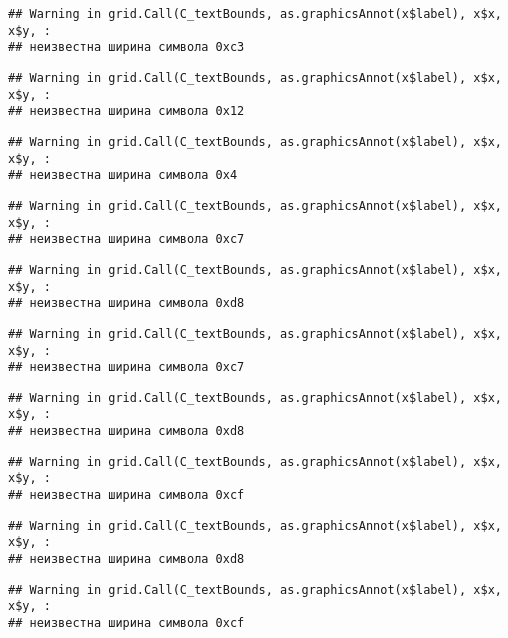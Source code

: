 \documentclass[
]{article}
\begin{document}
\begin{verbatim}
## Warning in grid.Call(C_textBounds, as.graphicsAnnot(x$label), x$x, x$y, :
## неизвестна ширина символа 0xc3
\end{verbatim}

\begin{verbatim}
## Warning in grid.Call(C_textBounds, as.graphicsAnnot(x$label), x$x, x$y, :
## неизвестна ширина символа 0x12
\end{verbatim}

\begin{verbatim}
## Warning in grid.Call(C_textBounds, as.graphicsAnnot(x$label), x$x, x$y, :
## неизвестна ширина символа 0x4
\end{verbatim}

\begin{verbatim}
## Warning in grid.Call(C_textBounds, as.graphicsAnnot(x$label), x$x, x$y, :
## неизвестна ширина символа 0xc7
\end{verbatim}

\begin{verbatim}
## Warning in grid.Call(C_textBounds, as.graphicsAnnot(x$label), x$x, x$y, :
## неизвестна ширина символа 0xd8
\end{verbatim}

\begin{verbatim}
## Warning in grid.Call(C_textBounds, as.graphicsAnnot(x$label), x$x, x$y, :
## неизвестна ширина символа 0xc7
\end{verbatim}

\begin{verbatim}
## Warning in grid.Call(C_textBounds, as.graphicsAnnot(x$label), x$x, x$y, :
## неизвестна ширина символа 0xd8
\end{verbatim}

\begin{verbatim}
## Warning in grid.Call(C_textBounds, as.graphicsAnnot(x$label), x$x, x$y, :
## неизвестна ширина символа 0xcf
\end{verbatim}

\begin{verbatim}
## Warning in grid.Call(C_textBounds, as.graphicsAnnot(x$label), x$x, x$y, :
## неизвестна ширина символа 0xd8
\end{verbatim}

\begin{verbatim}
## Warning in grid.Call(C_textBounds, as.graphicsAnnot(x$label), x$x, x$y, :
## неизвестна ширина символа 0xcf
\end{verbatim}
\end{document}
